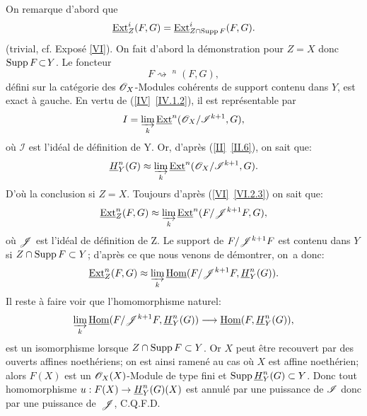 On remarque d'abord que
\[
\mathop{\underline{\mathrm{Ext}}}\nolimits^i_Z(F, G) = \mathop{\underline{\mathrm{Ext}}}\nolimits^i_{Z \cap \operatorname{Supp} F}(F, G).
\]
(trivial, cf. Expos\'e \ref{VI}). On fait d'abord la d\'emonstration pour $Z \!=\! X$ donc \hbox{$\operatorname{Supp} F \!\subset\! Y$}. Le foncteur
\[F \rightsquigarrow \mathop{\underline{\mathrm{Ext}}}\nolimits^n(F, G),
\]
d\'efini sur la cat\'egorie des $\mathscr{O}_X$-Modules coh\'erents de support contenu dans $Y$, est exact \`a gauche. En vertu de (\ref{IV}~\ref{IV.1.2}), il est repr\'esentable par
\[I = \varinjlim_{k} \mathop{\underline{\mathrm{Ext}}}\nolimits^n (\mathscr{O}_X/\mathscr{I}^{k+1}, G),
\]
o\`u $\mathcal{I}$ est l'id\'eal de d\'efinition de Y. Or, d'apr\`es (\ref{II}~\ref{II.6}), on sait que:
\[
\underline{H}^n_Y(G) \approx \varinjlim_{k} \mathop{\underline{\mathrm{Ext}}}\nolimits^n (\mathscr{O}_X/\mathscr{I}^{k+1}, G).
\]
D'o\`u la conclusion si $ Z= X$. Toujours d'apr\`es (\ref{VI}~\ref{VI.2.3}) on sait que:
\[
\mathop{\underline{\mathrm{Ext}}}\nolimits^n_Z (F, G) \approx \varinjlim_{k} \mathop{\underline{\mathrm{Ext}}}\nolimits^n (F/{\mathscr J}^{k + 1}F, G),
\]
o\`u ${\mathscr J}$ est l'id\'eal de d\'efinition de Z. Le support de $F/{\mathscr J}^{k+1}F$ est contenu dans $Y$ si $Z \cap \operatorname{Supp} F \subset Y$; d'apr\`es ce que nous venons de d\'emontrer, on~a donc:
\[
\mathop{\underline{\mathrm{Ext}}}\nolimits^n_Z (F, G) \approx \varinjlim_{k} \mathop{\underline{\mathrm{Hom}}}\nolimits (F/{\mathscr J}^{k + 1}F, \underline{H}^n_Y(G)).
\]
Il reste \`a faire voir que l'homomorphisme naturel:
\[
\varinjlim_{k} \mathop{\underline{\mathrm{Hom}}}\nolimits (F/\Jj^{k + 1}F, \HH^n_Y(G)) \to \mathop{\underline{\mathrm{Hom}}}\nolimits (F, \HH^n_Y (G)),
\]
est un isomorphisme lorsque $Z \cap \operatorname{Supp} F \subset Y$. Or $X$ peut \^etre recouvert par des ouverts affines noeth\'eriens; on est ainsi ramen\'e au cas o\`u $X$ est affine noeth\'erien; alors $F(X)$ est un $\mathscr{O}_X(X)$-Module de type fini et $\operatorname{Supp} \underline{H}^n_Y(G) \subset Y$. Donc tout homomorphisme \hbox{$u: F(X) \to \HH^n_Y (G) (X)$} est annul\'e par une puissance de ${\mathscr I}$ donc par une puissance de~${\mathscr J}$, C.Q.F.D.

